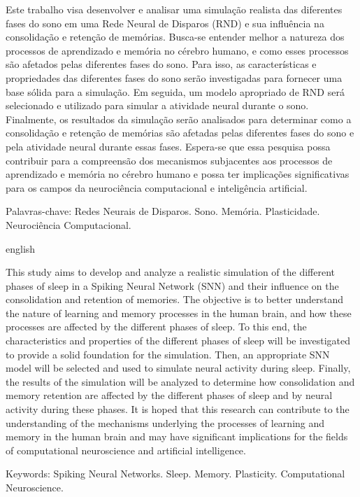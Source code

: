 \begin{resumo}
\noindent
 
Este trabalho visa desenvolver e analisar uma simulação realista das diferentes fases do sono em uma Rede Neural de Disparos (RND)
e sua influência na consolidação e retenção de memórias. Busca-se entender melhor a natureza dos processos de aprendizado e
memória no cérebro humano, e como esses processos são afetados pelas diferentes fases do sono. Para isso, as características e
propriedades das diferentes fases do sono serão investigadas para fornecer uma base sólida para a simulação. Em seguida, um modelo
apropriado de RND será selecionado e utilizado para simular a atividade neural durante o sono. Finalmente, os resultados da
simulação serão analisados para determinar como a consolidação e retenção de memórias são afetadas pelas diferentes fases do sono
e pela atividade neural durante essas fases. Espera-se que essa pesquisa possa contribuir para a compreensão dos mecanismos
subjacentes aos processos de aprendizado e memória no cérebro humano e possa ter implicações significativas para os campos da
neurociência computacional e inteligência artificial.

\vspace{0.2cm}   
Palavras-chave: Redes Neurais de Disparos. Sono. Memória. Plasticidade. Neurociência Computacional. 
\end{resumo}
 
\begin{resumo}[Abstract]	
\begin{otherlanguage*}{english}
\noindent 
 
This study aims to develop and analyze a realistic simulation of the different phases of sleep in a Spiking Neural Network (SNN)
and their influence on the consolidation and retention of memories. The objective is to better understand the nature of learning
and memory processes in the human brain, and how these processes are affected by the different phases of sleep. To this end, the
characteristics and properties of the different phases of sleep will be investigated to provide a solid foundation for the
simulation. Then, an appropriate SNN model will be selected and used to simulate neural activity during sleep. Finally, the
results of the simulation will be analyzed to determine how consolidation and memory retention are affected by the different
phases of sleep and by neural activity during these phases. It is hoped that this research can contribute to the understanding of
the mechanisms underlying the processes of learning and memory in the human brain and may have significant implications for the
fields of computational neuroscience and artificial intelligence.
 
\vspace{0.2cm}
Keywords: Spiking Neural Networks. Sleep. Memory. Plasticity. Computational Neuroscience.
\end{otherlanguage*}
\end{resumo}
